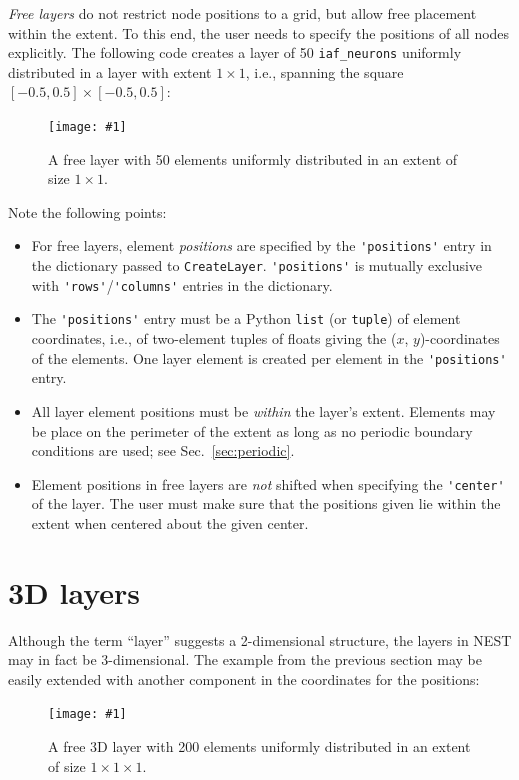 \documentclass[a4paper,12pt]{report}
\newcommand{\scriptfig}[4]{%
\begin{figure}
\centerline{\texttt{[image: \#1]}}
\caption[#3]{#4}
\label{fig:#1}
\end{figure}%
}
\begin{document}
\emph{Free layers} do not restrict node positions to
a grid, but allow free placement within the extent. To this end, the
user needs to specify the positions of all nodes explicitly. The
following code creates a layer of 50 \lstinline!iaf_neurons! uniformly
distributed in a layer with extent $1\times 1$, i.e., spanning the
square $[-0.5,0.5]\times[-0.5,0.5]$:
%

\scriptfig{layer4}{0.5}{Layer with freely spaced elements.}%
{A free layer with 50 elements uniformly distributed in an extent of
size $1\times 1$.}
%
Note the following points:
\begin{itemize}
\item For free layers, element \emph{positions} are
  specified by the \lstinline!'positions'! entry in the dictionary
  passed to \lstinline!CreateLayer!. \lstinline!'positions'! is
  mutually exclusive with \lstinline!'rows'!/\lstinline!'columns'!
  entries in the dictionary.
\item The \lstinline!'positions'! entry must be a Python
  \lstinline!list! (or \lstinline!tuple!) of element coordinates,
  i.e., of two-element tuples of floats giving the ($x$, $y$)-coordinates
  of the elements. One layer element is created per element in the
  \lstinline!'positions'! entry.
\item All layer element positions must be \emph{within} the layer's
  extent. Elements may be place on the perimeter of the extent as long
  as no periodic boundary conditions are used; see Sec.~\ref{sec:periodic}.
\item Element positions in free layers are \emph{not} shifted when
  specifying the \lstinline!'center'! of the layer. The user must make
  sure that the positions given lie within the extent when centered
  about the given center.
\end{itemize}


\section{3D layers}\label{sec:3dlayer}

Although the term ``layer'' suggests a 2-dimensional structure, the layers
in NEST may in fact be 3-dimensional.  The example from
the previous section may be easily extended with another component in the
coordinates for the positions:
%

\scriptfig{layer4_3d}{0.5}{3D layer with freely spaced elements.}%
{A free 3D layer with 200 elements uniformly distributed in an extent of
size $1\times 1\times 1$.}
%
\end{document}
